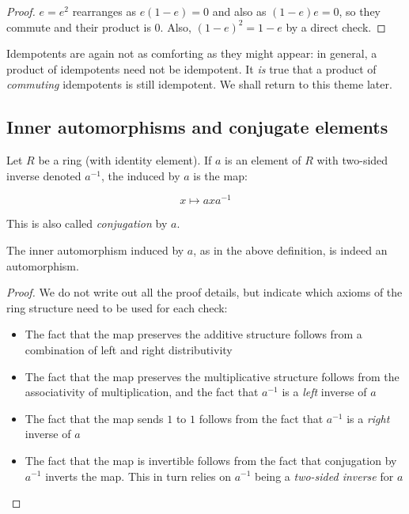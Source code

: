 \documentclass[a4paper]{amsart}
\begin{document}
\begin{proof}
  $e = e^2$ rearranges as $e(1 - e) = 0$ and also as $(1 - e)e = 0$,
  so they commute and their product is $0$. Also, $(1 - e)^2 = 1 - e$
  by a direct check.
\end{proof}

Idempotents are again not as comforting as they might appear: in
general, a product of idempotents need not be idempotent. It {\em is}
true that a product of {\em commuting} idempotents is still
idempotent. We shall return to this theme later.

\subsection{Inner automorphisms and conjugate elements}

\begin{definer}
  Let $R$ be a ring (with identity element). If $a$ is an element of
  $R$ with two-sided inverse denoted $a^{-1}$, the  induced by $a$ is the map:

  $$x \mapsto axa^{-1}$$
  
  This is also called {\em conjugation} by $a$.
\end{definer}

\begin{claimer}
  The inner automorphism induced by $a$, as in the above definition,
  is indeed an automorphism.
\end{claimer}

\begin{proof}
  We do not write out all the proof details, but indicate
  which axioms of the ring structure need to be used for each check:

  \begin{itemize}

  \item The fact that the map preserves the additive structure follows
    from a combination of left and right distributivity
  \item The fact that the map preserves the multiplicative structure
    follows from the associativity of multiplication, and the fact
    that $a^{-1}$ is a {\em left} inverse of $a$
  \item The fact that the map sends $1$ to $1$ follows from the fact
    that $a^{-1}$ is a {\em right} inverse of $a$
  \item The fact that the map is invertible follows from the fact that
    conjugation by $a^{-1}$ inverts the map. This in turn relies on
    $a^{-1}$ being a {\em two-sided inverse} for $a$
  \end{itemize}
\end{proof}
\end{document}
